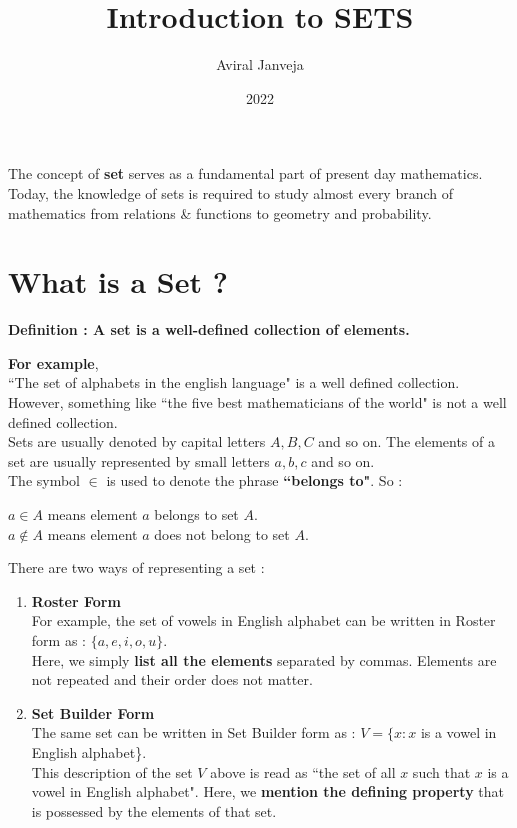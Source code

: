 \documentclass[12pt, letterpaper]{article}
\title{\textbf{\Huge Introduction to SETS}}
\author{Aviral Janveja}
\date{2022}
\begin{document}
\maketitle

The concept of \textbf{set} serves as a fundamental part of present day mathematics.\\ 
Today, the knowledge of sets is required to study almost every branch of mathematics from relations \& functions to geometry and probability.

\section{What is a Set ?}
\begin{displayquote}
\textbf{Definition : A set is a well-defined collection of elements.}
\end{displayquote}
\textbf{For example},\\ 
``The set of alphabets in the english language" is a well defined collection. However, something like ``the five best mathematicians of the world" is not a well defined collection.\\
Sets are usually denoted by capital letters $A, B, C$ and so on. The elements of a set are usually represented by small letters $a, b, c$ and so on.\\
The symbol $\mathbf{\in}$ is used to denote the phrase \textbf{``belongs to"}. So : 
\begin{displayquote}
$a \in A$ means element $a$ belongs to set $A$.\\
$a \notin A$ means element $a$ does not belong to set $A$.
\end{displayquote}
There are two ways of representing a set : 
\begin{enumerate}
    \item \textbf{Roster Form}\\
    For example, the set of vowels in English alphabet can be written in Roster form as : $\{a,e,i,o,u\}$.\\
    Here, we simply \textbf{list all the elements} separated by commas. Elements are not repeated and their order does not matter.
    \item \textbf{Set Builder Form}\\
    The same set can be written in Set Builder form as : $V = \{x : x$ is a vowel in English alphabet\}.\\
    This description of the set $V$ above is read as ``the set of all $x$ such that $x$ is a vowel in English alphabet". Here, we \textbf{mention the defining property} that is possessed by the elements of that set.
\end{enumerate}
\end{document}
